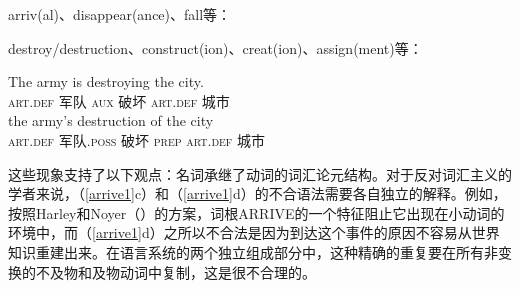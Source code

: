 \begin{exe}\ex
\label{arrive1} 
arriv(al)、disappear(ance)、fall等：
\begin{xlist}[iv.]
\zl

\begin{exe}\ex
\label{trans}
destroy/destruction、construct(ion)、creat(ion)、assign(ment)等：
\begin{xlist}[iv.]
\ex 
\gll The army is destroying the city.\\
     \textsc{art}.\textsc{def} 军队 \textsc{aux} 破坏 \textsc{art}.\textsc{def} 城市\\
\ex 
\gll the army's destruction of the city\\
     \textsc{art}.\textsc{def} 军队.\textsc{poss} 破坏 \textsc{prep} \textsc{art}.\textsc{def} 城市\\
\zl

\noindent
这些现象支持了以下观点：名词承继了动词的词汇论元结构。对于反对词汇主义的学者来说，（\ref{arrive1}c）和（\ref{arrive1}d）的不合语法需要各自独立的解释。例如，按照Harley和Noyer（\citeyear{HN2000a}）的方案，词根ARRIVE的一个特征阻止它出现在小动词的环境中，而（\ref{arrive1}d）之所以不合法是因为到达这个事件的原因不容易从世界知识重建出来。在语言系统的两个独立组成部分中，这种精确的重复要在所有非变换的不及物和及物动词中复制，这是很不合理的。


\end{xlist}
\end{exe}
\end{xlist}
\end{exe}
